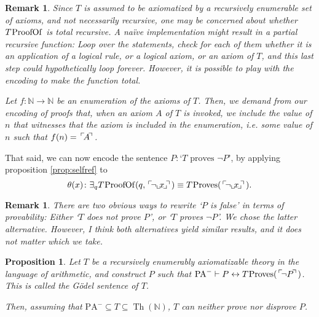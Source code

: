 \documentclass{article}
\newtheorem{prop}[theorem]{Proposition}
\newtheorem{remark}[theorem]{Remark}
\theoremstyle{nonumberplain}
\newcommand{\N}{\mathbb{N}}
\newcommand{\PA}{\mathrm{PA}}
\newcommand{\WPA}{\PA^-}
\DeclareMathOperator{\Proves}{\mspace{-2mu}Proves}
\DeclareMathOperator{\ProofOf}{\mspace{-2mu}ProofOf}
\DeclareMathOperator{\Th}{Th}
\newcommand{\gn}[1]{\setbox0=\hbox{$\mathclap{\phantom{t}}#1$} \dimen0=\ht0 \advance\dimen0 by -1.25ex \,\raise\dimen0\hbox{$\ulcorner$} \! \box0 \! \raise\dimen0\hbox{$\urcorner$}\,}
\newcommand{\gf}[1]{\raise-0.25ex\hbox{$\llcorner$}\! #1 \!\raise-0.25ex\hbox{$\lrcorner$}}
\begin{document}
\begin{remark}
Since $T$ is assumed to be axiomatized by a recursively \emph{enumerable} set of axioms, and not necessarily recursive, one may be concerned about whether $T\ProofOf$ is total recursive. A naïve implementation might result in a partial recursive function: Loop over the statements, check for each of them whether it is an application of a logical rule, or a logical axiom, or an axiom of $T$, and this last step could hypothetically loop forever. However, it is possible to play with the encoding to make the function total.

Let $f \colon \N \to \N$ be an enumeration of the axioms of $T$. Then, we demand from our encoding of proofs that, when an axiom $A$ of $T$ is invoked, we include the value of $n$ that witnesses that the axiom is included in the enumeration, i.e. some value of $n$ such that $f(n) = \gn A$.
\end{remark}

That said, we can now encode the sentence $P \colon \text{`$T$ proves $\neg P$'}$, by applying proposition \ref{prop:selfref} to
\begin{equation}
\theta(x) \colon \exists_q T\ProofOf(q,\gn{\neg \gf x}) \equiv T\Proves(\gn{\neg \gf x}).
\end{equation}

\begin{remark}
There are two obvious ways to rewrite `$P$ is false' in terms of provability: Either `$T$ does not prove $P$', or `$T$ proves $\neg P$'. We chose the latter alternative. However, I think both alternatives yield similar results, and it does not matter which we take.
\end{remark}

\begin{prop}\label{prop:inc1g}
Let $T$ be a recursively enumerably axiomatizable theory in the language of arithmetic, and construct $P$ such that $\WPA \vdash P \leftrightarrow T\Proves(\gn{\neg P})$. This is called \emph{the Gödel sentence of $T$}.

Then, assuming that $\WPA \subseteq T \subseteq \Th(\N)$, $T$ can neither prove nor disprove $P$.
\end{prop}
\end{document}
